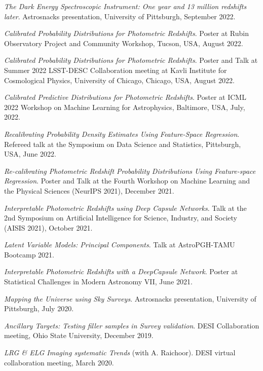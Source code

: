 \begin{etaremune}[leftmargin=40pt,labelsep=10pt]
    \item \textit{The Dark Energy Spectroscopic Instrument: One year and 13 million redshifts later}. Astrosnacks presentation, University of Pittsburgh, September 2022.
    \item \textit{Calibrated Probability Distributions for Photometric Redshifts}. Poster at Rubin Observatory Project and Community Workshop, Tucson, USA, August 2022.
    \item \textit{Calibrated Probability Distributions for Photometric Redshifts}. Poster and Talk at Summer 2022 LSST-DESC Collaboration meeting at Kavli Institute for Cosmological Physics, University of Chicago, Chicago, USA, August 2022.
    \item \textit{Calibrated Predictive Distributions for Photometric Redshifts}. Poster at ICML 2022 Workshop on Machine Learning for Astrophysics, Baltimore, USA, July, 2022.
    \item \textit{Recalibrating Probability Density Estimates Using Feature-Space Regression}. Refereed talk at the Symposium on Data Science and Statistics, Pittsburgh, USA, June 2022.
    \item \textit{Re-calibrating Photometric Redshift Probability Distributions Using Feature-space Regression}. Poster and Talk at the Fourth Workshop on Machine Learning and the Physical Sciences (NeurIPS 2021), December 2021.
    \item \textit{Interpretable Photometric Redshifts using Deep Capsule Networks}. Talk at the 2nd Symposium on Artificial Intelligence for Science, Industry, and Society (AISIS 2021), October 2021.
     \item \textit{Latent Variable Models: Principal Components}. Talk at AstroPGH-TAMU Bootcamp 2021.
    \item \textit{Interpretable Photometric Redshifts with a DeepCapsule Network}. Poster at Statistical Challenges in Modern Astronomy VII, June 2021.
    \item \textit{Mapping the Universe using Sky Surveys}. Astrosnacks presentation, University of Pittsburgh, July 2020.
    \item \textit{Ancillary Targets: Testing filler samples in Survey validation}. DESI Collaboration meeting, Ohio State University, December 2019.
    \item \textit{LRG \& ELG Imaging systematic Trends} (with A. Raichoor). DESI virtual collaboration meeting, March 2020.
\end{etaremune}

